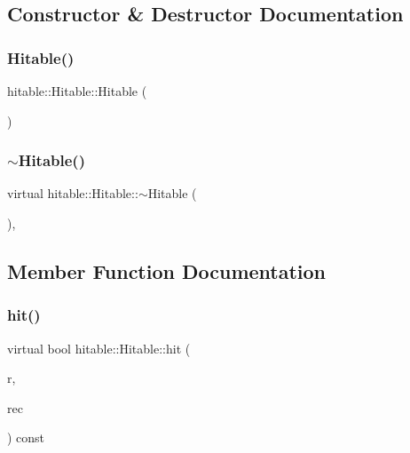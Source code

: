 \subsection{Constructor \& Destructor Documentation}
\mbox{\label{classhitable_1_1Hitable_a37bb01dc7d96f6c08a6a18cec2041d88}} 
\subsubsection{\texorpdfstring{Hitable()}{Hitable()}}
{\footnotesize\ttfamily hitable\+::\+Hitable\+::\+Hitable (\begin{DoxyParamCaption}{ }\end{DoxyParamCaption})\hspace{0.3cm}{\ttfamily [inline]}}

\mbox{\label{classhitable_1_1Hitable_a20bdcd63cb5135667d4feb77a910d815}} 
\subsubsection{\texorpdfstring{$\sim$Hitable()}{~Hitable()}}
{\footnotesize\ttfamily virtual hitable\+::\+Hitable\+::$\sim$\+Hitable (\begin{DoxyParamCaption}{ }\end{DoxyParamCaption})\hspace{0.3cm}{\ttfamily [inline]}, {\ttfamily [virtual]}}



\subsection{Member Function Documentation}
\mbox{\label{classhitable_1_1Hitable_a6bc67aefe8669316b369e2034644bed0}} 
\subsubsection{\texorpdfstring{hit()}{hit()}}
{\footnotesize\ttfamily virtual bool hitable\+::\+Hitable\+::hit (\begin{DoxyParamCaption}\item[{const \mbox{\hyperlink{classRay}{Ray}} \&}]{r,  }\item[{\mbox{\hyperlink{structhitable_1_1HitRecord}{Hit\+Record}} $\ast$}]{rec }\end{DoxyParamCaption}) const\hspace{0.3cm}{\ttfamily [pure virtual]}}



